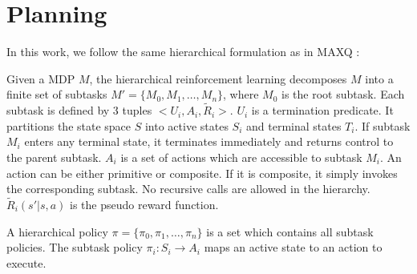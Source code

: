 \chapter{Planning}

In this work, we follow the same hierarchical formulation as in MAXQ \cite{MaxQJ}:
\begin{definition}
    Given a MDP $M$, the hierarchical reinforcement learning decomposes $M$ into a finite
    set of subtasks $M' = \{M_0, M_1, \dots, M_n\}$, where $M_0$ is the root subtask. 
    Each subtask is defined by 3 tuples $<U_i, A_i, \tilde{R}_i>$. 
    $U_i$ is a termination predicate. It partitions the state space $S$ into active states $S_i$ and
                terminal states $T_i$. If subtask $M_i$ enters any terminal state, it terminates immediately
                and returns control to the parent subtask. 
    $A_i$ is a set of actions which are accessible to subtask $M_i$. An action can be either primitive or composite.
                If it is composite, it simply invokes the corresponding subtask. No recursive calls 
                are allowed in the hierarchy.
    $\tilde{R}_i(s'|s, a)$ is the pseudo reward function. 
\end{definition}
A hierarchical policy $\pi = \{\pi_0, \pi_1, \dots, \pi_n\}$ is a set which contains all subtask policies. 
The subtask policy $\pi_i: S_i \rightarrow A_i$ maps an active state to an action to execute.



